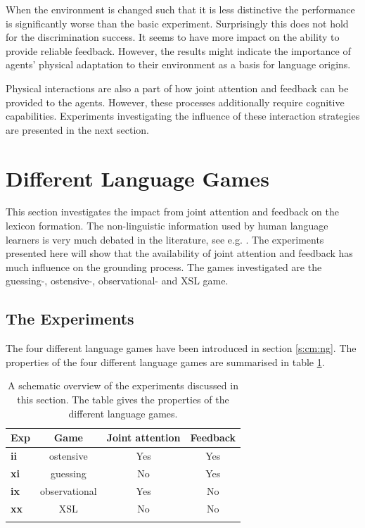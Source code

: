When the environment is changed such that it is less distinctive the performance is significantly worse than the basic experiment. Surprisingly this does not hold for the discrimination success. It seems to have more impact on the ability to provide reliable feedback. However, the results might indicate the importance of agents' physical adaptation to their environment as a basis for language origins.


Physical interactions are also a part of how joint attention and feedback can be provided to the agents. However, these processes additionally require cognitive capabilities. Experiments investigating the influence of these interaction strategies are presented in the next section.


\section{Different Language Games}\label{s:par:feed}

This section investigates the impact from joint attention and feedback on the lexicon formation. The non-linguistic information used by human language learners is very much debated in the literature, see e.g. \citep{bowerman:1988,barrett:1995}. The experiments presented here will show that the availability of joint attention and feedback has much influence on the grounding process. The games investigated are the guessing-, ostensive-, observational- and XSL game.


\subsection{The Experiments}

The four different language games have been introduced in section \ref{s:cm:ng}. The properties of the four different language games are summarised in table \ref{t:par:lg}.

\begin{table}[h]
\centering
\begin{tabular}{lccc}
\lsptoprule
Exp & Game & Joint attention & Feedback\\
\midrule
{\bf ii} & ostensive & Yes & Yes\\
{\bf xi} & guessing & No & Yes\\
{\bf ix} & observational & Yes & No\\
{\bf xx} & XSL & No & No\\
\lspbottomrule
\end{tabular}
\caption{A schematic overview of the experiments discussed in this section. The table gives the properties of the different language games.}
\label{t:par:lg}
\end{table}


